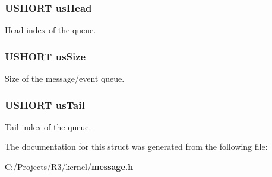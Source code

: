 \subsubsection[{usHead}]{\setlength{\rightskip}{0pt plus 5cm}USHORT {\bf usHead}}\label{struct_m_e_s_s_a_g_e___s_t_r_u_c_t_a494d767ed7938005cb40bae40e80626c}


Head index of the queue. 
\subsubsection[{usSize}]{\setlength{\rightskip}{0pt plus 5cm}USHORT {\bf usSize}}\label{struct_m_e_s_s_a_g_e___s_t_r_u_c_t_a27bae3014e7dc0b9e6e69c230dc1f85d}


Size of the message/event queue. 
\subsubsection[{usTail}]{\setlength{\rightskip}{0pt plus 5cm}USHORT {\bf usTail}}\label{struct_m_e_s_s_a_g_e___s_t_r_u_c_t_a5de6f1e7bbb7dd40053fcf905fc7d20d}


Tail index of the queue. 

The documentation for this struct was generated from the following file:\begin{DoxyCompactItemize}
\item 
C:/Projects/R3/kernel/{\bf message.h}\end{DoxyCompactItemize}
